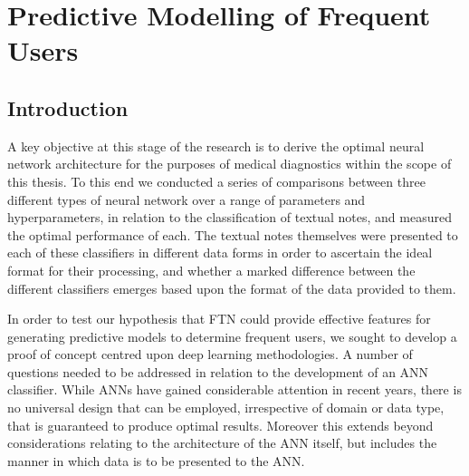  \chapter{Predictive Modelling of Frequent Users}
 \label{chpt:predictive-modelling}
 
 
  \newcommand\MyBox[2]{
  \fbox{\lower0.75cm
    \vbox to 1.7cm{\vfil
      \hbox to 1.7cm{\hfil\parbox{1.4cm}{#1\\#2}\hfil}
      \vfil}%
  }%
}
 

\section{Introduction}


















A key objective at this stage of the research is to derive the optimal neural network architecture for the purposes of medical diagnostics within the scope of this thesis. To this end we conducted a series of comparisons between three different types of neural network over a range of parameters and hyperparameters, in relation to the classification of textual notes, and measured the optimal performance of each. The textual notes themselves were presented to each of these classifiers in different data forms in order to ascertain the ideal format for their processing, and whether a marked difference between the different classifiers emerges based upon the format of the data provided to them. 




In order to test our hypothesis that FTN could provide effective features for generating predictive models to determine frequent users, we sought to develop a proof of concept centred upon deep learning methodologies. A number of questions needed to be addressed in relation to the development of an ANN classifier. While ANNs have gained considerable attention in recent years, there is no universal design that can be employed, irrespective of domain or data type, that is guaranteed to produce optimal results. Moreover this extends beyond considerations relating to the architecture of the ANN itself, but includes the manner in which data is to be presented to the ANN.  

